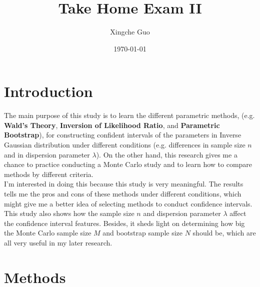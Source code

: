 \documentclass[12pt]{article}
\title{Take Home Exam II}
\author{Xingche Guo}
\date{\today}
\begin{document}
\maketitle

\section{Introduction}
The main purpose of this study is to learn the different parametric methods, (e.g. \textbf{Wald's Theory}, \textbf{Inversion of Likelihood Ratio}, and \textbf{Parametric Bootstrap}), for constructing confident intervals of the parameters in Inverse Gaussian distribution under different conditions (e.g.  differences in sample size $n$ and in dispersion parameter $\lambda$).  On the other hand, this research gives me a chance to practice conducting a Monte Carlo study and to learn how to compare methods by different criteria.\\ 

I'm interested in doing this because this study is very meaningful. The results tells me the pros and cons of these methods under different conditions, which might give me a better idea of selecting methods to conduct confidence intervals. This study also shows how the sample size $n$ and dispersion parameter $\lambda$ affect the confidence interval features. Besides, it sheds light on determining how big the Monte Carlo sample size $M$ and bootstrap sample size $N$ should be, which are all very useful in my later research.













\section{Methods}
\end{document}
